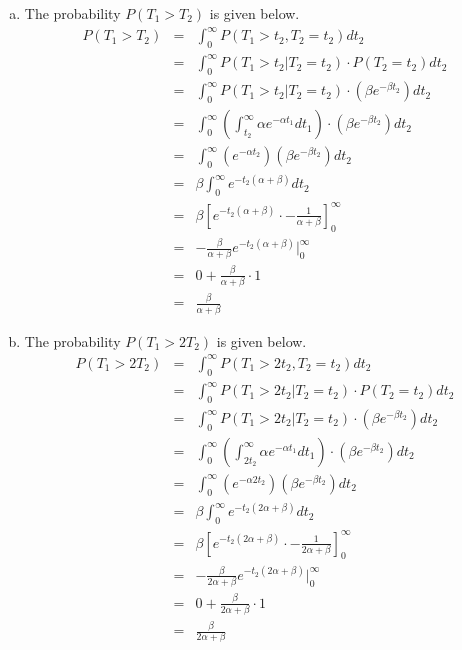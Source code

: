 \documentclass[a4paper, 10pt]{article}
\newcounter{prob_num}
\begin{document}
\begin{enumerate}[(a)]
\item The probability $P(T_1 > T_2)$ is given below.
\begin{eqnarray}
P(T_1 > T_2) &=& \int_0^\infty P(T_1 > t_2, T_2 = t_2)dt_2                                  \nonumber \\
             &=& \int_0^\infty P(T_1 > t_2 | T_2 = t_2)\cdot P(T_2=t_2)dt_2                 \nonumber \\
             &=& \int_0^\infty P(T_1 > t_2 | T_2 = t_2)\cdot (\beta e^{-\beta t_2})dt_2     \nonumber \\
             &=& \int_0^\infty \left( \int_{t_2}^\infty \alpha e^{-\alpha t_1}dt_1 \right)\cdot (\beta e^{-\beta t_2})dt_2     \nonumber \\
             &=& \int_0^\infty (e^{-\alpha t_2})(\beta e^{-\beta t_2})dt_2     \nonumber \\
             &=& \beta \int_0^\infty e^{-t_2(\alpha + \beta)}dt_2     \nonumber \\
             &=& \beta \left[ e^{-t_2(\alpha + \beta)}\cdot -\frac{1}{\alpha + \beta}\right]_0^\infty     \nonumber \\
             &=& -\frac{\beta}{\alpha + \beta}e^{-t_2(\alpha + \beta)}\bigg|_0^\infty     \nonumber \\
             &=& 0 + \frac{\beta}{\alpha + \beta}\cdot 1 \nonumber \\
             &=& \frac{\beta}{\alpha + \beta} \nonumber
\end{eqnarray}
\item The probability $P(T_1 > 2T_2)$ is given below.
\begin{eqnarray}
P(T_1 > 2T_2) &=& \int_0^\infty P(T_1 > 2t_2, T_2 = t_2)dt_2                                  \nonumber \\
             &=& \int_0^\infty P(T_1 > 2t_2 | T_2 = t_2)\cdot P(T_2=t_2)dt_2                 \nonumber \\
             &=& \int_0^\infty P(T_1 > 2t_2 | T_2 = t_2)\cdot (\beta e^{-\beta t_2})dt_2     \nonumber \\
             &=& \int_0^\infty \left( \int_{2t_2}^\infty \alpha e^{-\alpha t_1}dt_1 \right)\cdot (\beta e^{-\beta t_2})dt_2     \nonumber \\
             &=& \int_0^\infty \left(e^{-\alpha 2 t_2}\right)(\beta e^{-\beta t_2})dt_2     \nonumber \\
             &=& \beta \int_0^\infty e^{-t_2(2\alpha + \beta)}dt_2     \nonumber \\
             &=& \beta \left[ e^{-t_2(2\alpha + \beta)}\cdot -\frac{1}{2\alpha + \beta}\right]_0^\infty     \nonumber \\
             &=& -\frac{\beta}{2\alpha + \beta}e^{-t_2(2\alpha + \beta)}\bigg|_0^\infty     \nonumber \\
             &=& 0 + \frac{\beta}{2\alpha + \beta}\cdot 1 \nonumber \\
             &=& \frac{\beta}{2\alpha + \beta} \nonumber
\end{eqnarray}
\end{enumerate}
\end{document}
